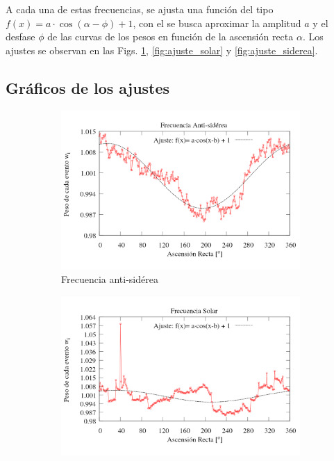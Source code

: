 	A cada una de estas frecuencias, se ajusta una función del tipo  $f(x)=a\cdot \cos{(\alpha-\phi)} + 1$, con el se busca aproximar la amplitud $a$ y el desfase $\phi$ de las curvas de los pesos en función de la ascensión recta $\alpha$. Los ajustes se observan en las Figs. \ref{fig:ajuste_antisiderea}, \ref{fig:ajuste_solar} y \ref{fig:ajuste_siderea}.


	\subsection{Gráficos de los ajustes}

		
		\begin{figure}[H]
		\begin{subfigure}{.5\textwidth}
			\centering
			\includegraphics[width=\linewidth]{eventos_RA_ajuste_cos_antisiderea_v2.png}
			\caption{Frecuencia anti-sidérea}
			\label{fig:ajuste_antisiderea}
		\end{subfigure}%
		\begin{subfigure}{.5\textwidth}
			\centering
			\includegraphics[width=\linewidth]{eventos_RA_ajuste_cos_solar_v3.png}

\end{subfigure}
\end{figure}
